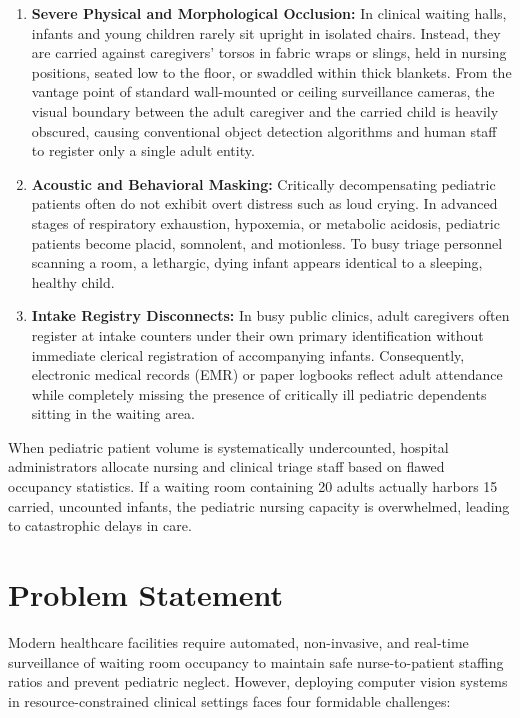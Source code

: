 \begin{enumerate}
    \item \textbf{Severe Physical and Morphological Occlusion:}  
   In clinical waiting halls, infants and young children rarely sit upright in isolated chairs. Instead, they are carried against caregivers' torsos in fabric wraps or slings, held in nursing positions, seated low to the floor, or swaddled within thick blankets. From the vantage point of standard wall-mounted or ceiling surveillance cameras, the visual boundary between the adult caregiver and the carried child is heavily obscured, causing conventional object detection algorithms and human staff to register only a single adult entity.

    \item \textbf{Acoustic and Behavioral Masking:}  
   Critically decompensating pediatric patients often do not exhibit overt distress such as loud crying. In advanced stages of respiratory exhaustion, hypoxemia, or metabolic acidosis, pediatric patients become placid, somnolent, and motionless. To busy triage personnel scanning a room, a lethargic, dying infant appears identical to a sleeping, healthy child.

    \item \textbf{Intake Registry Disconnects:}  
   In busy public clinics, adult caregivers often register at intake counters under their own primary identification without immediate clerical registration of accompanying infants. Consequently, electronic medical records (EMR) or paper logbooks reflect adult attendance while completely missing the presence of critically ill pediatric dependents sitting in the waiting area.
\end{enumerate}

When pediatric patient volume is systematically undercounted, hospital administrators allocate nursing and clinical triage staff based on flawed occupancy statistics. If a waiting room containing 20 adults actually harbors 15 carried, uncounted infants, the pediatric nursing capacity is overwhelmed, leading to catastrophic delays in care.

\section{Problem Statement}

Modern healthcare facilities require automated, non-invasive, and real-time surveillance of waiting room occupancy to maintain safe nurse-to-patient staffing ratios and prevent pediatric neglect. However, deploying computer vision systems in resource-constrained clinical settings faces four formidable challenges:

